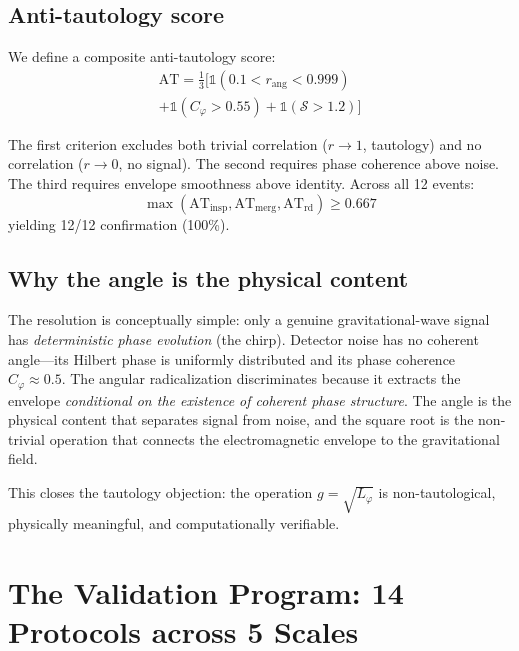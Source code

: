 \documentclass[12pt,a4paper,twocolumn]{article}
\begin{document}
\subsection{Anti-tautology score}

We define a composite anti-tautology score:
\begin{multline}
\text{AT} = \tfrac{1}{3}\bigl[\mathbb{1}(0.1 < r_{\text{ang}} < 0.999) \\
+ \mathbb{1}(C_\varphi > 0.55) + \mathbb{1}(\mathcal{S} > 1.2)\bigr]
\end{multline}

The first criterion excludes both trivial correlation ($r \to 1$, tautology) and no correlation ($r \to 0$, no signal). The second requires phase coherence above noise. The third requires envelope smoothness above identity. Across all 12 events:
\begin{equation}
\max(\text{AT}_{\text{insp}}, \text{AT}_{\text{merg}}, 
\text{AT}_{\text{rd}}) \geq 0.667
\end{equation}
yielding 12/12 confirmation (100\%).

\subsection{Why the angle is the physical content}

The resolution is conceptually simple: only a genuine gravitational-wave signal has \emph{deterministic phase evolution} (the chirp). Detector noise has no coherent angle---its Hilbert phase is uniformly distributed and its phase coherence $C_\varphi \approx 0.5$. The angular radicalization discriminates because it extracts the envelope \emph{conditional on the existence of coherent phase structure}. The angle is the physical content that separates signal from noise, and the square root is the non-trivial operation that connects the electromagnetic envelope to the gravitational field.

This closes the tautology objection: the operation $g = \sqrt{L_\varphi}$ is non-tautological, physically meaningful, and computationally verifiable.



\section{The Validation Program: 14 Protocols across 5 Scales}
\label{sec:protocols}
\end{document}
